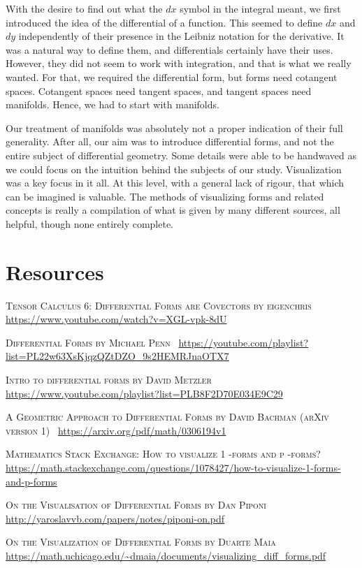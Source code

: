 \documentclass[a4paper,12pt]{article}
\begin{document}
With the desire to find out what the $dx$ symbol in the integral meant, we first introduced the idea of the differential of a function.
This seemed to define $dx$ and $dy$ independently of their presence in the Leibniz notation for the derivative.
It was a natural way to define them, and differentials certainly have their uses.
However, they did not seem to work with integration, and that is what we really wanted.
For that, we required the differential form, but forms need cotangent spaces.
Cotangent spaces need tangent spaces, and tangent spaces need manifolds.
Hence, we had to start with manifolds.

Our treatment of manifolds was absolutely not a proper indication of their full generality.
After all, our aim was to introduce differential forms, and not the entire subject of differential geometry.
Some details were able to be handwaved as we could focus on the intuition behind the subjects of our study.
Visualization was a key focus in it all.
At this level, with a general lack of rigour, that which can be imagined is valuable.
The methods of visualizing forms and related concepts is really a compilation of what is given by many different sources, all helpful, though none entirely complete.

\section{Resources}

\textsc{Tensor Calculus 6: Differential Forms are Covectors by eigenchris} \, \url{https://www.youtube.com/watch?v=XGL-vpk-8dU}

\textsc{Differential Forms by Michael Penn} \, \url{https://youtube.com/playlist?list=PL22w63XsKjqzQZtDZO_9s2HEMRJnaOTX7}

\textsc{Intro to differential forms by David Metzler} \, \url{https://www.youtube.com/playlist?list=PLB8F2D70E034E9C29}

\textsc{A Geometric Approach to Differential Forms by David Bachman (arXiv version 1)} \, \url{https://arxiv.org/pdf/math/0306194v1}

\textsc{Mathematics Stack Exchange: How to visualize 1 -forms and p -forms?} \, \url{https://math.stackexchange.com/questions/1078427/how-to-visualize-1-forms-and-p-forms}

\textsc{On the Visualisation of Differential Forms by Dan Piponi} \, \url{http://yaroslavvb.com/papers/notes/piponi-on.pdf}

\textsc{On the Visualization of Differential Forms by Duarte Maia} \, \url{https://math.uchicago.edu/~dmaia/documents/visualizing_diff_forms.pdf}
\end{document}
